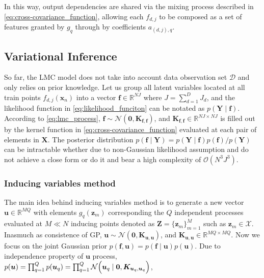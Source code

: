 In this way, output dependencies are shared via the mixing process described in \cref{eq:cross-covariance_function}, allowing each \( f_{d,j} \) to be composed as a set of features granted by \( g_q \) through by coefficients \( a_{(d,j),q} \).

\subsection{Variational Inference}

So far, the LMC model does not take into account data observation set \( \boldsymbol{\mathcal{D}} \) and only relies on prior knowledge. Let us group all latent variables located at all train points \( f_{d,j}(\boldsymbol{x}_n) \) into a vector \( \boldsymbol{f} \in \mathbb{R}^{NJ} \) where \( J = \sum_{d=1}^D J_d \), and the likelihood function in \cref{eq:likelihood_funciton} can be notated as \( p(\boldsymbol{Y} \mid \boldsymbol{f}) \). According to \cref{eq:lmc_process}, \( \boldsymbol{f} \sim \mathcal{N}\left(\boldsymbol{0}, \boldsymbol{K}_{\boldsymbol{f},\boldsymbol{f}} \right) \), and \( \boldsymbol{K}_{\boldsymbol{f},\boldsymbol{f}} \in \mathbb{R}^{NJ \times NJ} \) is filled out by the kernel function in \cref{eq:cross-covariance_function} evaluated at each pair of elements in \( \boldsymbol{X} \). The posterior distribution \( p(\boldsymbol{f} \mid \boldsymbol{Y}) = p(\boldsymbol{Y} \mid \boldsymbol{f}) p(\boldsymbol{f}) / p(\boldsymbol{Y}) \) can be intractable whether due to non-Gaussian likelihood assumption and do not achieve a close form or do it and bear a high complexity of \( \mathcal{O}(N^3J^3) \).


\subsubsection{Inducing variables method}

The main idea behind inducing variables method is to generate a new vector \( \boldsymbol{u} \in \mathbb{R}^{MQ} \) with elements \( g_q(\boldsymbol{z}_m) \) corresponding the \( Q \) independent processes evaluated at \( M \ll N \) inducing points denoted as \( \boldsymbol{Z} = \{ \boldsymbol{z}_m \}_{m=1}^M \) such as \( \boldsymbol{z}_m \in \mathcal{X} \). Inasmuch as consistence of GP, \( \boldsymbol{u} \sim \mathcal{N}\left(\boldsymbol{0}, \boldsymbol{K}_{\boldsymbol{u},\boldsymbol{u}} \right) \), and \( \boldsymbol{K}_{\boldsymbol{u},\boldsymbol{u}} \in \mathbb{R}^{MQ \times MQ} \). Now we focus on the joint Gaussian prior \( p(\boldsymbol{f}, \boldsymbol{u}) = p(\boldsymbol{f} \mid \boldsymbol{u}) p(\boldsymbol{u}) \). Due to independence property of \( \boldsymbol{u} \) process, \( p(\boldsymbol{u}) = \prod_{q=1}^{Q} p(\boldsymbol{u}_q) = \prod_{q=1}^{Q} \mathcal{N}\Bigl( \boldsymbol{u}_q \mid \boldsymbol{0}, \boldsymbol{K}_{\boldsymbol{u}_q,\boldsymbol{u}_q}  \Bigr) \), 

